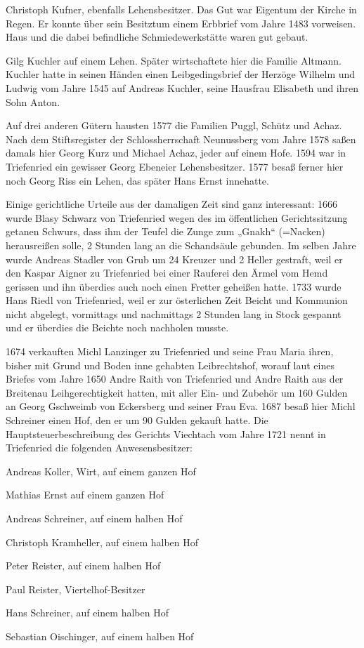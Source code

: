 \documentclass[12pt,a4pager]{book}
\begin{document}
Christoph Kufner, ebenfalls Lehensbesitzer. Das Gut war Eigentum der Kirche in
Regen. Er konnte über sein Besitztum einem Erbbrief vom Jahre 1483 vorweisen.
Haus und die dabei befindliche Schmiedewerkstätte waren gut gebaut.

Gilg Kuchler auf einem Lehen. Später wirtschaftete hier die Familie Altmann.
Kuchler hatte in seinen Händen einen Leibgedingsbrief der Herzöge Wilhelm und
Ludwig vom Jahre 1545 auf Andreas Kuchler, seine Hausfrau Elisabeth und ihren
Sohn Anton.

Auf drei anderen Gütern hausten 1577 die Familien Puggl, Schütz und Achaz. Nach
dem Stiftsregister der Schlossherrschaft Neunussberg vom Jahre 1578 saßen damals
hier Georg Kurz und Michael Achaz, jeder auf einem Hofe. 1594 war in Triefenried
ein gewisser Georg Ebeneier Lehensbesitzer. 1577 besaß ferner hier noch Georg
Riss ein Lehen, das später Hans Ernst innehatte.

Einige gerichtliche Urteile aus der damaligen Zeit sind ganz interessant: 1666
wurde Blasy Schwarz von Triefenried wegen des im öffentlichen Gerichtssitzung
getanen Schwurs, dass ihm der Teufel die Zunge zum „Gnakh“ (=Nacken)
herausreißen solle, 2 Stunden lang an die Schandsäule gebunden. Im selben Jahre
wurde Andreas Stadler von Grub um 24 Kreuzer und 2 Heller gestraft, weil er den
Kaspar Aigner zu Triefenried bei einer Rauferei den Ärmel vom Hemd gerissen und
ihn überdies auch noch einen Fretter geheißen hatte. 1733 wurde Hans Riedl von
Triefenried, weil er zur österlichen Zeit Beicht und Kommunion nicht abgelegt,
vormittags und nachmittags 2 Stunden lang in Stock gespannt und er überdies die
Beichte noch nachholen musste.

1674 verkauften Michl Lanzinger zu Triefenried und seine Frau Maria ihren,
bisher mit Grund und Boden inne gehabten Leibrechtshof, worauf laut eines
Briefes vom Jahre 1650 Andre Raith von Triefenried und Andre Raith aus der
Breitenau Leihgerechtigkeit hatten, mit aller Ein- und Zubehör um 160 Gulden an
Georg Gschweimb von Eckersberg und seiner Frau Eva. 1687 besaß hier Michl
Schreiner einen Hof, den er um 90 Gulden gekauft hatte. Die
Hauptsteuerbeschreibung des Gerichts Viechtach vom Jahre 1721 nennt in
Triefenried die folgenden Anwesensbesitzer:

\begin{compactitem}
\item Andreas Koller, Wirt, auf einem ganzen Hof
\item Mathias Ernst auf einem ganzen Hof
\item Andreas Schreiner, auf einem halben Hof
\item Christoph Kramheller, auf einem halben Hof
\item Peter Reister, auf einem halben Hof
\item Paul Reister, Viertelhof-Besitzer
\item Hans Schreiner, auf einem halben Hof
\item Sebastian Oischinger, auf einem halben Hof
\end{compactitem}
\end{document}
